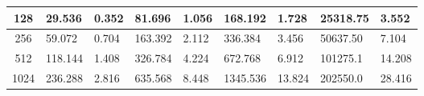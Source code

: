 \begin{table}[H]
\begin{tabular}{|c|l|l|l|l|l|l|l|l|}
128                    & 29.536                                                                           & 0.352                                                                        & 81.696                                                                           & 1.056                                                                        & 168.192                                                                          & 1.728                                                                        & 25318.75                                                                         & 3.552                                                                        \\ \hline
256                    & 59.072                                                                           & 0.704                                                                        & 163.392                                                                          & 2.112                                                                        & 336.384                                                                          & 3.456                                                                        & 50637.50                                                                         & 7.104                                                                        \\ \hline
512                    & 118.144                                                                          & 1.408                                                                        & 326.784                                                                          & 4.224                                                                        & 672.768                                                                          & 6.912                                                                        & 101275.1                                                                         & 14.208                                                                       \\ \hline
1024                   & 236.288                                                                          & 2.816                                                                        & 635.568                                                                          & 8.448                                                                        & 1345.536                                                                         & 13.824                                                                       & 202550.0                                                                         & 28.416                                                                       \\ \hline

\end{tabular}
\end{table}
